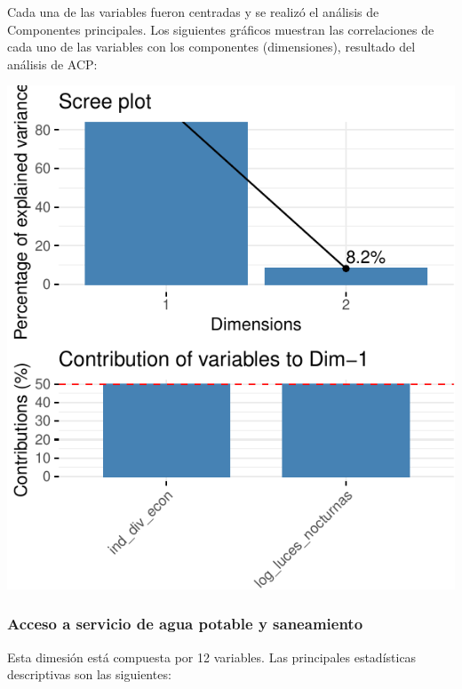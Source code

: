 Cada una de las variables fueron centradas y se realizó el análisis de
Componentes principales. Los siguientes gráficos muestran las
correlaciones de cada uno de las variables con los componentes
(dimensiones), resultado del análisis de ACP:

\includegraphics{Anexo_PCA_files/figure-latex/unnamed-chunk-1-2.pdf}

\hypertarget{acceso-a-servicio-de-agua-potable-y-saneamiento}{%
\subsubsection{Acceso a servicio de agua potable y
saneamiento}\label{acceso-a-servicio-de-agua-potable-y-saneamiento}}

Esta dimesión está compuesta por 12 variables. Las principales
estadísticas descriptivas son las siguientes:

